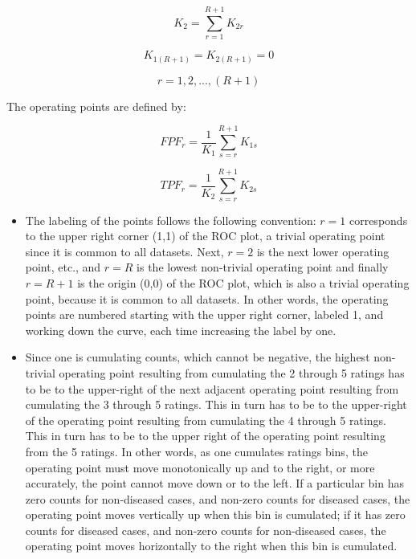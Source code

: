 \documentclass[
]{book}
\begin{document}
\begin{equation*} 
K_2=\sum_{r=1}^{R+1}K_{2r}
\end{equation*}

\begin{equation*} 
K_{1{(R+1)}} = K_{2{(R+1)}} = 0
\end{equation*}

\begin{equation*} 
r = 1,2,...,(R+1)
\end{equation*}

The operating points are defined by:

\begin{equation*} 
FPF_r=\frac {1} {K_1} \sum_{s=r}^{R+1}K_{1s}
\end{equation*}

\begin{equation*} 
TPF_r=\frac {1} {K_2} \sum_{s=r}^{R+1}K_{2s}
\end{equation*}

\begin{itemize}
\item
  The labeling of the points follows the following convention: \(r=1\) corresponds to the upper right corner (1,1) of the ROC plot, a trivial operating point since it is common to all datasets. Next, \(r=2\) is the next lower operating point, etc., and \(r=R\) is the lowest non-trivial operating point and finally \(r=R+1\) is the origin (0,0) of the ROC plot, which is also a trivial operating point, because it is common to all datasets. In other words, the operating points are numbered starting with the upper right corner, labeled 1, and working down the curve, each time increasing the label by one.
\item
  Since one is cumulating counts, which cannot be negative, the highest non-trivial operating point resulting from cumulating the 2 through 5 ratings has to be to the upper-right of the next adjacent operating point resulting from cumulating the 3 through 5 ratings. This in turn has to be to the upper-right of the operating point resulting from cumulating the 4 through 5 ratings. This in turn has to be to the upper right of the operating point resulting from the 5 ratings. In other words, as one cumulates ratings bins, the operating point must move monotonically up and to the right, or more accurately, the point cannot move down or to the left. If a particular bin has zero counts for non-diseased cases, and non-zero counts for diseased cases, the operating point moves vertically up when this bin is cumulated; if it has zero counts for diseased cases, and non-zero counts for non-diseased cases, the operating point moves horizontally to the right when this bin is cumulated.
\end{itemize}
\end{document}
